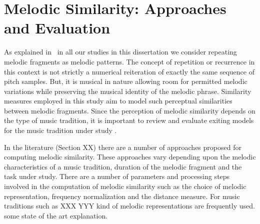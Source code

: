 \section{Melodic Similarity: Approaches and Evaluation}
\label{sec:patterns_evaluation_of_similarity_measures}

As explained in~ in all our studies in this dissertation we consider repeating melodic fragments as melodic patterns. The concept of repetition or recurrence in this context is not strictly a numerical reiteration of exactly the same sequence of pitch samples. But, it is musical in nature allowing room for permitted melodic variations while preserving the musical identity of the melodic phrase. Similarity measures employed in this study aim to model such perceptual similarities between melodic fragments. Since the perception of melodic similarity depends on the type of music tradition, it is important to review and evaluate exiting models for the music tradition under study .

In the literature (Section XX) there are a number of approaches proposed for computing melodic similarity. These approaches vary depending upon the melodic characteristics of a music tradition, duration of the melodic fragment and the task under study. There are a number of parameters and processing steps involved in the computation of melodic similarity such as the choice of melodic representation, frequency normalization and the distance measure. For music traditions such as XXX YYY kind of melodic representations are frequently used. some state of the art explanation.


